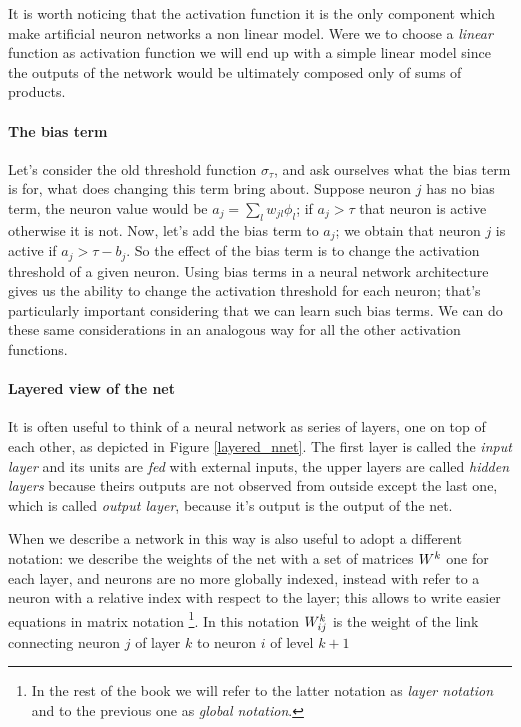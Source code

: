 It is worth noticing that the activation function it is the only component which make artificial neuron networks a non linear model. Were we to choose a \textit{linear} function as activation function we will
end up with a simple linear model since the outputs of the network would be ultimately composed only of sums of products.

\paragraph{The bias term}
Let's consider the old threshold function $\sigma_{\tau}$, and ask ourselves what the bias term is for, what does changing this term bring about.
Suppose neuron $j$ has no bias term, the neuron value would be $a_j = \sum_l w_{jl}\phi_l$; if $a_j>\tau$ that neuron is active otherwise it is not. Now, let's add the bias term to $a_j$;
we obtain that neuron $j$ is active if $a_j>\tau-b_j$. So the effect of the bias term is to change the activation threshold of a given neuron. Using bias terms in a neural network architecture gives us
the ability to change the activation threshold for each neuron; that's particularly important considering that we can learn such bias terms.
We can do these same considerations in an analogous way for all the other activation functions.
\paragraph{Layered view of the net}
It is often useful to think of a neural network as series of layers, one on top of each other, as depicted in Figure \ref{layered_nnet}. The first layer is called the \textit{input layer} and its units are \textit{fed}
with external inputs, the upper layers are called \textit{hidden layers} because theirs outputs are not observed from outside except the last one, which is called \textit{output layer}, because it's output 
is the output of the net.

When we describe a network in this way is also useful to adopt a different notation: we describe the weights of the net with a set of matrices $W^k$ one for each layer, and neurons are no more
globally indexed, instead with refer to a neuron with a relative index with respect to the layer; this allows to write easier equations in matrix notation
\footnote{In the rest of the book we will refer to the latter notation as \textsl{layer notation} and to the previous one as \textsl{global notation}.}.
In this notation $W^k_{ij}$ is the weight of the link connecting neuron $j$ of layer $k$ to neuron $i$ of level $k+1$


